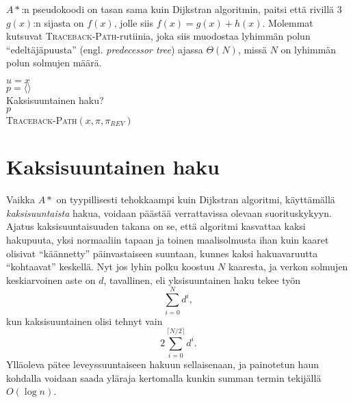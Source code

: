 \documentclass[finnish]{tktltiki2}
\newenvironment{finalgo}[1][htb]{
  \renewcommand{\algorithmcfname}{Algoritmi}
  \begin{algorithm}[#1]
}{\end{algorithm}}
\let\oldnl\nl%
\newcommand{\nonl}{\renewcommand{\nl}{\let\nl\oldnl}}
\theoremstyle{definition}
\theoremstyle{remark}
\begin{document}
\noindent $A\ast$:n pseudokoodi on tasan sama kuin Dijkstran algoritmin, paitsi että rivillä 3 $g(x)$:n sijasta on $f(x)$, jolle siis $f(x) = g(x) + h(x)$. Molemmat kutsuvat \textsc{Traceback-Path}-rutiinia, joka siis muodostaa lyhimmän polun ``edeltäjäpuusta'' (engl. \textit{predecessor tree}) ajassa $\Theta(N)$, missä $N$ on lyhimmän polun solmujen määrä.
\begin{finalgo}[H]
$u = x$ \\
$p = \langle  \rangle$ \\
\nonl Kaksisuuntainen haku? \\
\KwRet $p$ \\
\caption{\textsc{Traceback-Path}$(x, \pi, \pi_{REV})$}
\label{alg:tracebackpath}
\end{finalgo}

\section{Kaksisuuntainen haku}
Vaikka $A\ast$ on tyypillisesti tehokkaampi kuin Dijkstran algoritmi, käyttämällä \textit{kaksisuuntaista} hakua, voidaan päästää verrattavissa olevaan suorituskykyyn. Ajatus kaksisuuntaisuuden takana on se, että algoritmi kasvattaa kaksi hakupuuta, yksi normaaliin tapaan ja toinen maalisolmusta ihan kuin kaaret olisivat ``käännetty'' päinvastaiseen suuntaan, kunnes kaksi hakuavaruutta ``kohtaavat'' keskellä. Nyt jos lyhin polku koostuu $N$ kaaresta, ja verkon solmujen keskiarvoinen aste on $d$, tavallinen, eli yksisuuntainen haku tekee työn
\[
\sum_{i = 0}^N d^i,
\]
kun kaksisuuntainen olisi tehnyt vain
\[
2 \sum_{i = 0}^{\lceil N / 2 \rceil} d^i.
\]
Ylläoleva pätee leveyssuuntaiseen hakuun sellaisenaan, ja painotetun haun kohdalla voidaan saada yläraja kertomalla kunkin summan termin tekijällä $O(\log n)$. 
\end{document}
